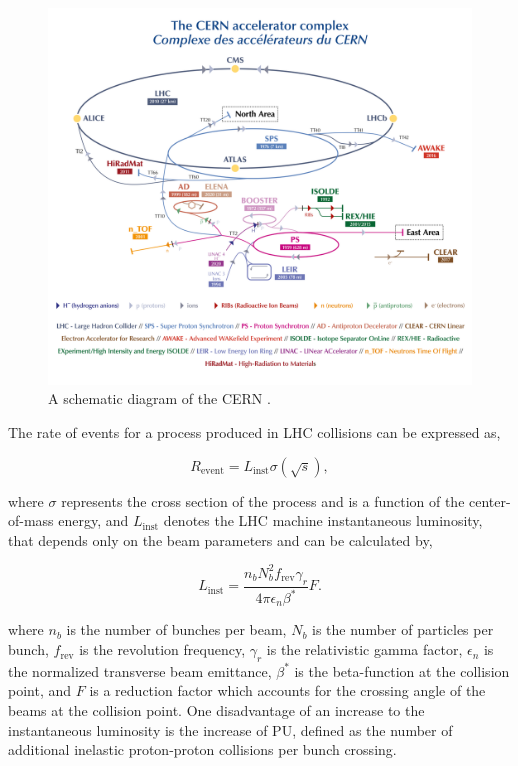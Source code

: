 \begin{figure}[t]
    \centering
    \includegraphics[width=\textwidth]{Figures/cern.png}
    \caption{A schematic diagram of the CERN  \cite{Bartosik:2847538}.}
    \label{fig:CERN_Schematic}
\end{figure}

The rate of events for a process produced in \ac{LHC} collisions can be expressed as,

\begin{equation}
R_{\text{event}} = L_{\text{inst}} \sigma(\sqrt{s}), 
\end{equation}

where $\sigma$ represents the cross section of the process and is a function of the center-of-mass energy, and $L_{\text{inst}}$ denotes the \ac{LHC} machine instantaneous luminosity, that depends only on the beam parameters and can be calculated by,

\begin{equation}
L_{\text{inst}} = \frac{n_{b}N_{b}^{2}f_{\text{rev}}\gamma_{r}}{4\pi \epsilon_{n}\beta^{*}}F.
\end{equation}

where $n_b$ is the number of bunches per beam, $N_b$ is the number of particles per bunch, $f_{\text{rev}}$ is the revolution frequency, $\gamma_r$ is the relativistic gamma factor, $\epsilon_n$ is the normalized transverse beam emittance, $\beta^*$ is the beta-function at the collision point, and $F$ is a reduction factor which accounts for the crossing angle of the beams at the collision point. 
One disadvantage of an increase to the instantaneous luminosity is the increase of \ac{PU}, defined as the number of additional inelastic proton-proton collisions per bunch crossing.

